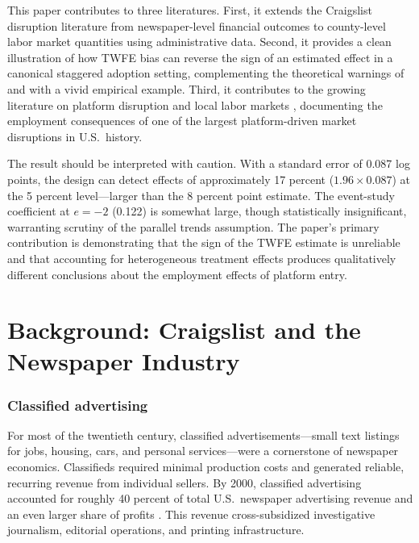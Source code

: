 \documentclass[12pt]{article}
\begin{document}
This paper contributes to three literatures. First, it extends the Craigslist disruption literature \citep{seamans_zhu_2014, cage_sraer_2022, kroft_pope_2014} from newspaper-level financial outcomes to county-level labor market quantities using administrative data. Second, it provides a clean illustration of how TWFE bias can reverse the sign of an estimated effect in a canonical staggered adoption setting, complementing the theoretical warnings of \citet{goodman_bacon_2021} and \citet{dechaisemartin_dhaultfoeuille_2020} with a vivid empirical example. Third, it contributes to the growing literature on platform disruption and local labor markets \citep{goldfarb_tucker_2019, autor_2019}, documenting the employment consequences of one of the largest platform-driven market disruptions in U.S.\ history.

The result should be interpreted with caution. With a standard error of 0.087 log points, the design can detect effects of approximately 17 percent ($1.96 \times 0.087$) at the 5 percent level---larger than the 8 percent point estimate. The event-study coefficient at $e = -2$ (0.122) is somewhat large, though statistically insignificant, warranting scrutiny of the parallel trends assumption. The paper's primary contribution is demonstrating that the sign of the TWFE estimate is unreliable and that accounting for heterogeneous treatment effects produces qualitatively different conclusions about the employment effects of platform entry.


\section{Background: Craigslist and the Newspaper Industry}

\subsubsection*{Classified advertising} For most of the twentieth century, classified advertisements---small text listings for jobs, housing, cars, and personal services---were a cornerstone of newspaper economics. Classifieds required minimal production costs and generated reliable, recurring revenue from individual sellers. By 2000, classified advertising accounted for roughly 40 percent of total U.S.\ newspaper advertising revenue and an even larger share of profits \citep{newspaper_association_2009}. This revenue cross-subsidized investigative journalism, editorial operations, and printing infrastructure.
\end{document}
